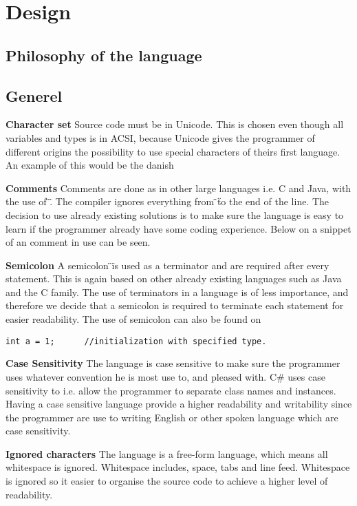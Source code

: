 \chapter{Design}
\label{cha:Design}
\section{Philosophy of the language}


\section{Generel}
\textbf{Character set}
Source code must be in Unicode.
This is chosen even though all variables and types is in ACSI, because Unicode gives the programmer of different origins the possibility to use special characters of theirs first language.
An example of this would be the danish %

\textbf{Comments}
Comments are done as in other large languages i.e. C and Java, with the use of \"\/\/\".
The compiler ignores everything from \"\/\/\" to the end of the line.
The decision  to use already existing solutions is to make sure the language is easy to learn if the programmer already have some coding experience.
Below on  a snippet of an comment in use can be seen.

\textbf{Semicolon}
A semicolon \"\;\" is used as a terminator and are required after every statement.
This is again based on other already existing languages such as Java and the C family.
The use of terminators in a language is of less importance, and therefore we decide that a semicolon is required to terminate each statement for easier readability.
The use of semicolon can also be found on 


\begin{lstlisting}[caption={Comment and Semicolon}]
int a = 1;		//initialization with specified type.
\end{lstlisting}

\textbf{Case Sensitivity}
The language is case sensitive to make sure the programmer uses whatever convention he is most use to, and pleased with.
C\# uses case sensitivity to i.e. allow the programmer to separate class names and instances.
Having a case sensitive language provide a higher readability and writability since the programmer are use to writing English or other spoken language which are case sensitivity.

\textbf{Ignored characters}
The language is a free-form language, which means all whitespace is ignored.
Whitespace includes, space, tabs and line feed.
Whitespace is ignored so it easier to organise  the source code to achieve a higher level of readability.

